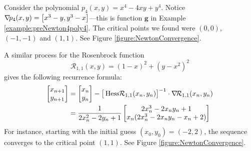 \begin{example}
Consider the polynomial $p_4(x,y) = x^4-4xy+y^4$. Notice $\mathop{\nabla\! {p_4}}(x,y) = \big[ x^3-y, y^3-x \big]$---this is function $\boldsymbol{g}$ in Example \ref{example:preNewton4poly4}.  The critical points we found were $(0,0)$, $(-1,-1)$ and $(1,1)$.  See Figure \ref{figure:NewtonConvergence}.
\end{example}
\begin{example}
A similar process for the Rosenbrock function 
\begin{equation*}
\mathcal{R}_{1,1}(x,y) = (1-x)^2 + (y-x^2)^2
\end{equation*}
gives the following recurrence formula:
\begin{align*}
\begin{bmatrix} x_{n+1} \\ y_{n+1} \end{bmatrix} &=
\begin{bmatrix} x_{n} \\ y_{n} \end{bmatrix} - \big[ \mathop{\mathrm{Hess}{\mathcal{R}_{1,1}}}(x_n,y_n) \big]^{-1} \cdot \mathop{\nabla\! {\mathcal{R}_{1,1}}}(x_n, y_n) \\
&= \frac{1}{2x_n^2-2y_n+1} \begin{bmatrix}
2x_n^3-2x_n y_n+1 \\ x_n(2x_n^3-2x_n y_n-x_n+2)
\end{bmatrix}
\end{align*}
For instance, starting with the initial guess $(x_0, y_0) = (-2,2)$, the sequence converges to the critical point $(1,1)$.  See Figure \ref{figure:NewtonConvergence}.
\end{example}
